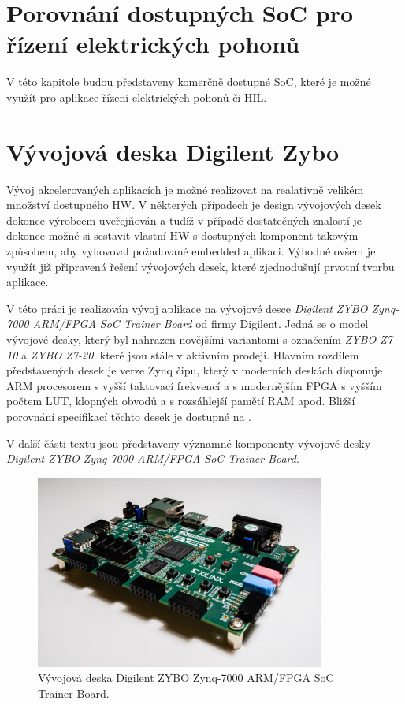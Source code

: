 \documentclass[a4paper, twoside, 11pt]{article}
\begin{document}
	\section{Porovnání dostupných SoC pro řízení elektrických pohonů}
			V této kapitole budou představeny komerčně dostupné SoC, které je možné využít pro aplikace řízení elektrických pohonů či HIL.


	\section{Vývojová deska Digilent Zybo}
			Vývoj akcelerovaných aplikacích je možné realizovat na realativně velikém množství dostupného HW. V některých případech je design vývojových desek dokonce výrobcem uveřejňován a tudíž v případě dostatečných znalostí je dokonce možné si sestavit vlastní HW s dostupných komponent takovým způsobem, aby vyhovoval požadované embedded aplikaci. Výhodné ovšem je využít již připravená řešení vývojových desek, které zjednodušují prvotní tvorbu aplikace.\par
			V této práci je realizován vývoj aplikace na vývojové desce \textit{Digilent ZYBO Zynq-7000 ARM/FPGA SoC Trainer Board} od firmy Digilent. \cite{digilent-zybo-7000-docs} Jedná se o model vývojové desky, který byl nahrazen novějšími variantami s označením \textit{ZYBO Z7-10} a \textit{ZYBO Z7-20}, které jsou stále v aktivním prodeji. Hlavním rozdílem představených desek je verze Zynq čipu, který v moderních deskách disponuje ARM procesorem s vyšší taktovací frekvencí a s modernějším FPGA s vyšším počtem LUT, klopných obvodů a s rozsáhlejší pamětí RAM apod. Bližší porovnání specifikací těchto desek je dostupné na \cite{digilent-zybo-compare}.\par
			V další části textu jsou představeny významné komponenty vývojové desky \textit{Digilent ZYBO Zynq-7000 ARM/FPGA SoC Trainer Board}.

			\begin{figure}[htbp!]
				\centering
					\includegraphics[width=0.85\textwidth]{src/jpg/digilent-zybo-foto-2.jpg} 
					\caption{Vývojová deska Digilent ZYBO Zynq-7000 ARM/FPGA SoC Trainer Board.}
					\label{fig:digilent-zybo-foto-2}
			\end{figure}
\end{document}
